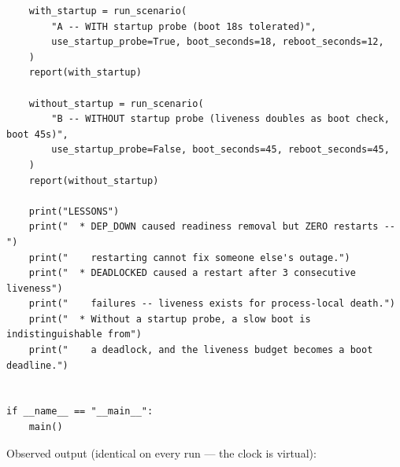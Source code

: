 \begin{verbatim}
    with_startup = run_scenario(
        "A -- WITH startup probe (boot 18s tolerated)",
        use_startup_probe=True, boot_seconds=18, reboot_seconds=12,
    )
    report(with_startup)

    without_startup = run_scenario(
        "B -- WITHOUT startup probe (liveness doubles as boot check, boot 45s)",
        use_startup_probe=False, boot_seconds=45, reboot_seconds=45,
    )
    report(without_startup)

    print("LESSONS")
    print("  * DEP_DOWN caused readiness removal but ZERO restarts --")
    print("    restarting cannot fix someone else's outage.")
    print("  * DEADLOCKED caused a restart after 3 consecutive liveness")
    print("    failures -- liveness exists for process-local death.")
    print("  * Without a startup probe, a slow boot is indistinguishable from")
    print("    a deadlock, and the liveness budget becomes a boot deadline.")


if __name__ == "__main__":
    main()
\end{verbatim}

Observed output (identical on every run --- the clock is virtual):

